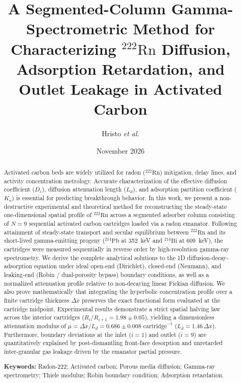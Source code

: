 \documentclass[11pt,a4paper]{article}
\title{\textbf{A Segmented-Column Gamma-Spectrometric Method for Characterizing $^{222}\text{Rn}$ Diffusion, Adsorption Retardation, and Outlet Leakage in Activated Carbon}}
\author[1]{Hristo \textit{et al.}}
\affil[1]{Department of Nuclear Engineering / Dosimetry and Radiation Protection Laboratory}
\date{November 2026}
\begin{document}
\maketitle

\begin{abstract}
\noindent
Activated carbon beds are widely utilized for radon ($^{222}\text{Rn}$) mitigation, delay lines, and activity concentration metrology. Accurate characterization of the effective diffusion coefficient ($D_e$), diffusion attenuation length ($L_d$), and adsorption partition coefficient ($K_a$) is essential for predicting breakthrough behavior. In this work, we present a non-destructive experimental and theoretical method for reconstructing the steady-state one-dimensional spatial profile of $^{222}\text{Rn}$ across a segmented adsorber column consisting of $N=9$ sequential activated carbon cartridges loaded via a radon emanator. Following attainment of steady-state transport and secular equilibrium between $^{222}\text{Rn}$ and its short-lived gamma-emitting progeny ($^{214}\text{Pb}$ at \SI{352}{keV} and $^{214}\text{Bi}$ at \SI{609}{keV}), the cartridges were measured sequentially in reverse order by high-resolution gamma-ray spectrometry. We derive the complete analytical solutions to the 1D diffusion-decay-adsorption equation under ideal open-end (Dirichlet), closed-end (Neumann), and leaking-end (Robin / dual-porosity bypass) boundary conditions, as well as a normalized attenuation profile relative to non-decaying linear Fickian diffusion. We also prove mathematically that integrating the hyperbolic concentration profile over a finite cartridge thickness $\Delta x$ preserves the exact functional form evaluated at the cartridge midpoint. Experimental results demonstrate a strict spatial halving law across the interior cartridges ($R_i / R_{i+1} = 1.98 \pm 0.05$), yielding a dimensionless attenuation modulus of $\mu = \Delta x / L_d = 0.686 \pm 0.008\text{ cartridge}^{-1}$ ($L_d = 1.46\,\Delta x$). Furthermore, boundary deviations at the inlet ($i=1$) and outlet ($i=9$) are quantitatively explained by post-dismantling front-face desorption and unretarded inter-granular gas leakage driven by the emanator partial pressure.

\vspace{0.3cm}
\noindent\textbf{Keywords:} Radon-222; Activated carbon; Porous media diffusion; Gamma-ray spectrometry; Thiele modulus; Robin boundary condition; Adsorption retardation.
\end{abstract}
\end{document}
